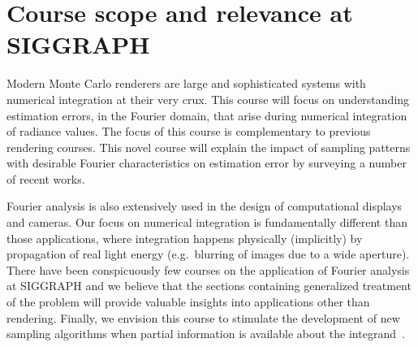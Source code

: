 \documentclass{acmsiggraph}
\begin{document}
\section{Course scope and relevance at SIGGRAPH}
Modern Monte Carlo renderers are large and sophisticated systems with numerical integration at their very crux. This course will focus on understanding estimation errors, in the Fourier domain, that arise during numerical integration of radiance values. The focus of this course is complementary to previous rendering courses. This novel course will explain the impact of sampling patterns with desirable Fourier characteristics on estimation error by surveying a number of recent works.

Fourier analysis is also extensively used in the design of computational displays and cameras. Our focus on numerical integration is fundamentally different than those applications, where integration happens physically (implicitly) by propagation of real light energy  (e.g.~blurring of images due to a wide aperture). There have been conspicuously few courses on the application of Fourier analysis at SIGGRAPH and we believe that the sections containing generalized treatment of the problem will provide valuable insights into applications other than rendering. Finally, we envision this course to stimulate the development of new sampling algorithms when partial information is available about the integrand~\cite{Cov5D}.
\end{document}
